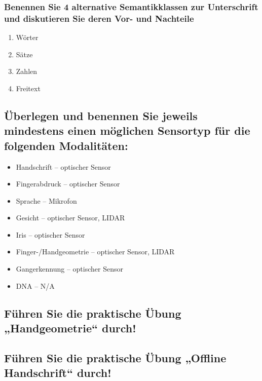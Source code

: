 \documentclass{article}
\begin{document}
\subsubsection{Benennen Sie 4 alternative Semantikklassen zur Unterschrift und diskutieren Sie deren Vor- und Nachteile}

\begin{enumerate}
	\item Wörter
	\item Sätze
	\item Zahlen
	\item Freitext
\end{enumerate}

\subsection{Überlegen und benennen Sie jeweils mindestens einen möglichen Sensortyp für die folgenden Modalitäten:}

\begin{itemize}
	\item Handschrift – optischer Sensor
	\item Fingerabdruck – optischer Sensor
	\item Sprache – Mikrofon
	\item Gesicht – optischer Sensor, LIDAR
	\item Iris – optischer Sensor
	\item Finger-/Handgeometrie – optischer Sensor, LIDAR
	\item Gangerkennung – optischer Sensor
	\item DNA – N/A
\end{itemize}

\subsection{Führen Sie die praktische Übung „Handgeometrie“ durch!}
\subsection{Führen Sie die praktische Übung „Offline Handschrift“ durch!}
\end{document}
